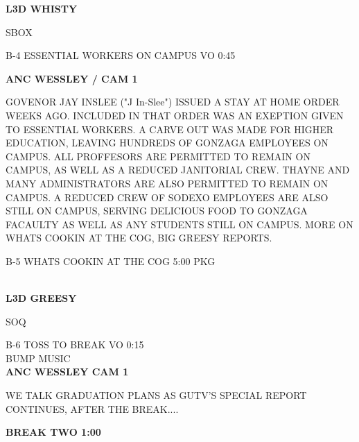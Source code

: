 \documentclass{article}
\newenvironment{changemargin}[2]{%
\begin{list}{}{%
\setlength{\topsep}{0pt}%
\setlength{\leftmargin}{#1}%
\setlength{\rightmargin}{#2}%
\setlength{\listparindent}{\parindent}%
\setlength{\itemindent}{\parindent}%
\setlength{\parsep}{\parskip}%
}%
\item[]}{\end{list}}
\begin{document}
\begin{flushleft}
\begin{changemargin}{-3cm}{-5cm}
\textbf{
L3D WHISTY
}

\color{red}
SBOX

\end{changemargin}
\vspace{8.5mm}

\begin{changemargin}{-3cm}{-5cm}
\color{red}
B-4  ESSENTIAL WORKERS ON CAMPUS    VO  0:45

\color{black}

\textbf{
ANC WESSLEY / CAM 1}
\end{changemargin}


\begin{changemargin}{4cm}{1cm}
GOVENOR JAY INSLEE ("J In-Slee") ISSUED A STAY AT HOME ORDER WEEKS AGO. INCLUDED IN THAT ORDER WAS AN EXEPTION GIVEN TO ESSENTIAL WORKERS. A CARVE OUT WAS MADE FOR HIGHER EDUCATION, LEAVING HUNDREDS OF GONZAGA EMPLOYEES ON CAMPUS. ALL PROFFESORS ARE PERMITTED TO REMAIN ON CAMPUS, AS WELL AS A REDUCED JANITORIAL CREW. THAYNE AND MANY ADMINISTRATORS ARE ALSO PERMITTED TO REMAIN ON CAMPUS. A REDUCED CREW OF SODEXO EMPLOYEES ARE ALSO STILL ON CAMPUS, SERVING DELICIOUS FOOD TO GONZAGA FACAULTY AS WELL AS ANY STUDENTS STILL ON CAMPUS. MORE ON WHATS COOKIN AT THE COG, BIG GREESY REPORTS.

\end{changemargin}

\begin{changemargin}{-3cm}{-5cm}
\color{red}
B-5     WHATS COOKIN AT THE COG   5:00   PKG

\\
\color{black}
\textbf{
L3D GREESY
}

\begin{changemargin}{-3cm}{-5cm}
\color{red}
SOQ

\end{changemargin}

\color{red}
\vspace{25mm}
B-6 TOSS TO BREAK VO 0:15\\
BUMP MUSIC \\
\color{black}
\textbf{ANC WESSLEY CAM 1}
\end{changemargin}

\begin{changemargin}{2cm}{1cm}
WE TALK GRADUATION PLANS AS GUTV'S SPECIAL REPORT CONTINUES, AFTER THE BREAK....
\end{changemargin}

\begin{changemargin}{4cm}{1cm}
\color{blue}
\textbf{BREAK TWO 1:00}
\end{changemargin}











\end{flushleft}
\end{document}
